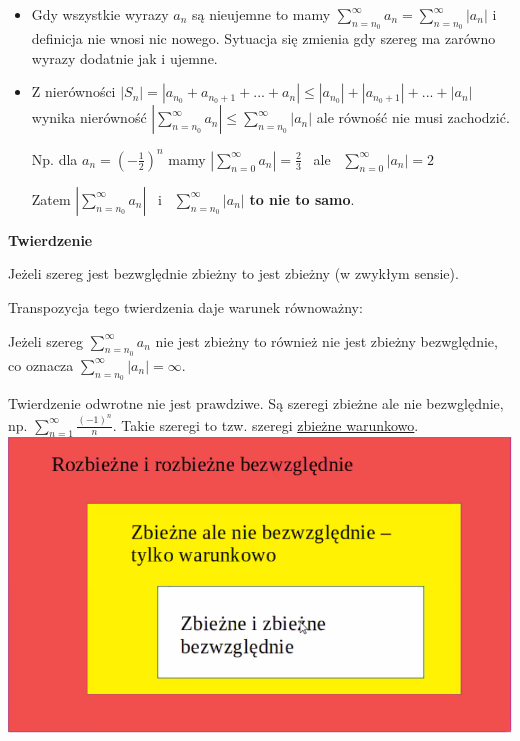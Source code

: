 \begin{itemize}
    \item Gdy wszystkie wyrazy $a_n$ są nieujemne to mamy $\sum\limits_{n=n_0}^{\infty} a_n = \sum\limits_{n=n_0}^{\infty} |a_n|$
    i definicja nie wnosi nic nowego. Sytuacja się zmienia gdy szereg ma zarówno wyrazy dodatnie jak i ujemne.
    \item Z nierówności $|S_n|= |a_{n_0} + a_{n_0+1} + ... + a_n| \leq |a_{n_0}| + |a_{n_0 + 1}| + ... + |a_n| $
    wynika nierówność $ \left| \sum\limits_{n=n_0}^{\infty} a_n \right| \leq \sum\limits_{n=n_0}^{\infty} |a_n| $
    ale równość nie musi zachodzić.

    Np. dla $ a_n = \left( -\frac{1}{2} \right)^n $ mamy $ \left| \sum\limits_{n=0}^{\infty} a_n \right| = \frac{2}{3} $
    \ ale \ $  \sum\limits_{n=0}^{\infty} |a_n| = 2 $

    Zatem $ \left| \sum\limits_{n=n_0}^{\infty} a_n \right| $ \ i \ $ \sum\limits_{n=n_0}^{\infty} |a_n| $ \textbf{to nie to samo}. \\
\end{itemize}

\textbf{Twierdzenie}

Jeżeli szereg jest bezwględnie zbieżny to jest zbieżny (w zwykłym sensie).

Transpozycja tego twierdzenia daje warunek równoważny:

Jeżeli szereg $ \sum\limits_{n = n_0}^{\infty} a_n $ nie jest zbieżny to również nie jest zbieżny bezwględnie, co oznacza
$ \sum\limits_{n=n_0}^{\infty} |a_n| = \infty $.

Twierdzenie odwrotne nie jest prawdziwe. Są szeregi zbieżne ale nie bezwględnie, np.
$ \sum\limits_{n=1}^{\infty} \frac{(-1)^n}{n} $. Takie szeregi to tzw. szeregi \underline{zbieżne warunkowo}. \\

\includegraphics[scale=0.6]{rozbiezneirozbiezne.png} \\

